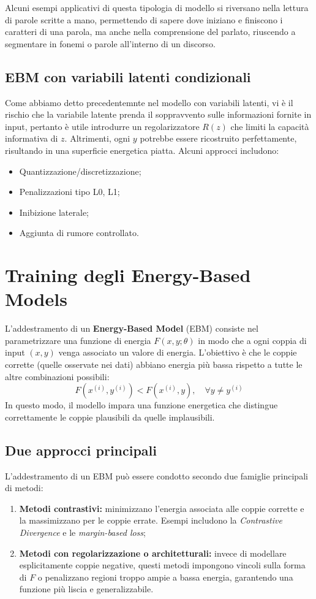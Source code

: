 Alcuni esempi applicativi di questa tipologia di modello si riversano nella lettura di parole scritte a mano, permettendo di sapere dove iniziano e finiscono i caratteri di una parola, ma anche nella comprensione del parlato, riuscendo a segmentare in fonemi o parole all'interno di un discorso.

\subsection{EBM con variabili latenti condizionali}
Come abbiamo detto precedentemnte nel modello con variabili latenti, vi è il rischio che la variabile latente prenda il soppravvento sulle informazioni fornite in input, pertanto è utile introdurre un regolarizzatore $R(z)$ che limiti la capacità informativa di $z$. Altrimenti, ogni $y$ potrebbe essere ricostruito perfettamente, risultando in una superficie energetica piatta. Alcuni approcci includono:
\begin{itemize}
    \item Quantizzazione/discretizzazione;
    \item Penalizzazioni tipo L0, L1;
    \item Inibizione laterale;
    \item Aggiunta di rumore controllato.
\end{itemize}

\section{Training degli Energy-Based Models}

L’addestramento di un \textbf{Energy-Based Model} (EBM) consiste nel parametrizzare una funzione di energia $F(x, y; \theta)$ in modo che a ogni coppia di input $(x, y)$ venga associato un valore di energia. L’obiettivo è che le coppie corrette (quelle osservate nei dati) abbiano energia più bassa rispetto a tutte le altre combinazioni possibili:
\begin{equation}
    F(x^{(i)}, y^{(i)}) < F(x^{(i)}, y), \quad \forall y \neq y^{(i)}
\end{equation}
In questo modo, il modello impara una funzione energetica che distingue correttamente le coppie plausibili da quelle implausibili.
\subsection{Due approcci principali}
L’addestramento di un EBM può essere condotto secondo due famiglie principali di metodi:
\begin{enumerate}
    \item \textbf{Metodi contrastivi:} minimizzano l’energia associata alle coppie corrette e la massimizzano per le coppie errate. Esempi includono la \textit{Contrastive Divergence} e le \textit{margin-based loss};
    \item \textbf{Metodi con regolarizzazione o architetturali:} invece di modellare esplicitamente coppie negative, questi metodi impongono vincoli sulla forma di $F$ o penalizzano regioni troppo ampie a bassa energia, garantendo una funzione più liscia e generalizzabile.
\end{enumerate}

